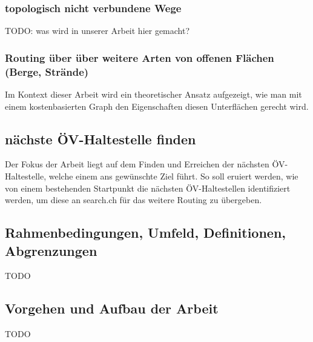 \subsubsection{topologisch nicht verbundene Wege}
\label{Ziel subsub:topologisch nicht verbundene Wege}
TODO: was wird in unserer Arbeit hier gemacht?

\subsubsection{Routing über über weitere Arten von offenen Flächen (Berge, Strände)}
\label{subsub:Ziel Routing über über weitere Arten von offenen Flächen (Berge, Strände)}
Im Kontext dieser Arbeit wird ein theoretischer Ansatz aufgezeigt, wie man mit einem kostenbasierten Graph den Eigenschaften diesen Unterflächen gerecht wird.

\subsection{nächste ÖV-Haltestelle finden}
\label{subsub:Ziel nächste ÖV-Haltestelle finden}
Der Fokus der Arbeit liegt auf dem Finden und Erreichen der nächsten ÖV-Haltestelle, welche einem ans gewünschte Ziel führt. So soll eruiert werden, wie von einem bestehenden Startpunkt die nächsten ÖV-Haltestellen identifiziert werden, um diese an search.ch für das weitere Routing zu übergeben.
	
\subsection{Rahmenbedingungen, Umfeld, Definitionen, Abgrenzungen}
\label{sub:Rahmenbedingungen, Umfeld, Definitionen, Abgrenzungen}
TODO

\subsection{Vorgehen und Aufbau der Arbeit}
\label{sub:Vorgehen und Aufbau der Arbeit}
TODO
